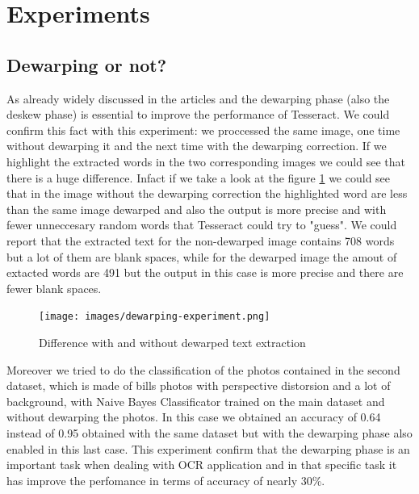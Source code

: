 \documentclass[10pt,twocolumn,letterpaper]{article}
\begin{document}
\section{Experiments}
\label{sec:experiments}

\subsection{Dewarping or not?}
As already widely discussed in the articles \cite{Improvingcamera-based} and \cite{recoveringhomography} the dewarping phase (also the deskew phase) is essential to improve the performance of Tesseract. We could confirm this fact with this experiment: we proccessed the same image, one time without dewarping it and the next time with the dewarping correction. If we highlight the extracted words in the two corresponding images we could see that there is a huge difference. Infact if we take a look at the figure \ref{dewarping-experiment} we could see that in the image without the dewarping correction the highlighted word are less than the same image dewarped and also the output is more precise and with fewer unneccesary random words that Tesseract could try to "guess". We could report that the extracted text for the non-dewarped image contains 708 words but a lot of them are blank spaces, while for the dewarped image the amout of extacted words are 491 but the output in this case is more precise and there are fewer blank spaces.

\begin{figure}[b]
	\centering
	\texttt{[image: images/dewarping-experiment.png]}
	\caption{Difference with and without dewarped text extraction}
	\label{dewarping-experiment}
\end{figure}

Moreover we tried to do the classification of the photos contained in the second dataset, which is made of bills photos with perspective distorsion and a lot of background, with Naive Bayes Classificator trained on the main dataset and without dewarping the photos. In this case we obtained an accuracy of 0.64 instead of 0.95 obtained with the same dataset but with the dewarping phase also enabled in this last case. This experiment confirm that the dewarping phase is an important task when dealing with OCR application and in that specific task it has improve the perfomance in terms of accuracy of nearly 30\%.
\end{document}
